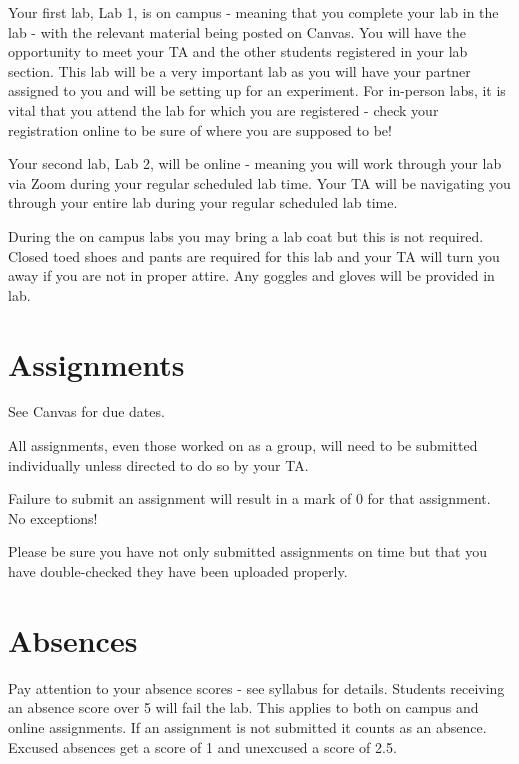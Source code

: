 \documentclass[
]{book}
\begin{document}
Your first lab, Lab 1, is on campus - meaning that you complete your lab in the lab - with the relevant material being posted on Canvas. You will have the opportunity to meet your TA and the other students registered in your lab section. This lab will be a very important lab as you will have your partner assigned to you and will be setting up for an experiment. For in-person labs, it is vital that you attend the lab for which you are registered - check your registration online to be sure of where you are supposed to be!

Your second lab, Lab 2, will be online - meaning you will work through your lab via Zoom during your regular scheduled lab time. Your TA will be navigating you through your entire lab during your regular scheduled lab time.

During the on campus labs you may bring a lab coat but this is not required. Closed toed shoes and pants are required for this lab and your TA will turn you away if you are not in proper attire. Any goggles and gloves will be provided in lab.

\hypertarget{assignments}{%
\section*{Assignments}\label{assignments}}

See Canvas for due dates.

All assignments, even those worked on as a group, will need to be submitted individually unless directed to do so by your TA.

Failure to submit an assignment will result in a mark of 0 for that assignment. No exceptions!

Please be sure you have not only submitted assignments on time but that you have double-checked they have been uploaded properly.

\hypertarget{absences}{%
\section*{Absences}\label{absences}}

Pay attention to your absence scores - see syllabus for details. Students receiving an absence score over 5 will fail the lab. This applies to both on campus and online assignments. If an assignment is not submitted it counts as an absence. Excused absences get a score of 1 and unexcused a score of 2.5.
\end{document}
